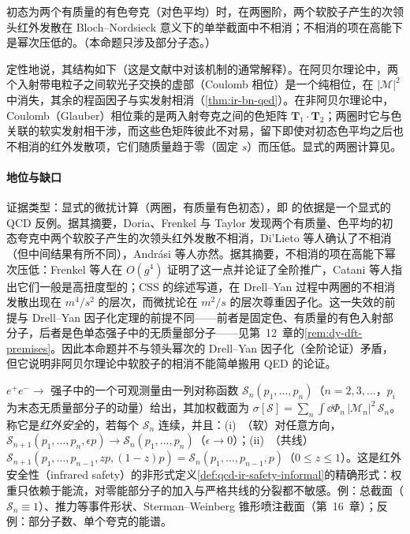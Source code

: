\begin{proposition}\label{prop:ir-bn-failure}
初态为两个有质量的有色夸克（对色平均）时，在两圈阶，两个软胶子产生的次领头红外发散在 Bloch--Nordsieck 意义下的单举截面中不相消；不相消的项在高能下是幂次压低的。（本命题只涉及部分子态。）
\end{proposition}
\begin{proofsketch}
定性地说，其结构如下（这是文献中对该机制的通常解释）。在阿贝尔理论中，两个入射带电粒子之间软光子交换的虚部（Coulomb 相位）是一个纯相位，在 $|\mathcal M|^2$ 中消失，其余的程函因子与实发射相消（\cref{thm:ir-bn-qed}）。在非阿贝尔理论中，Coulomb（Glauber）相位乘的是两入射夸克之间的色矩阵 $\mathbf T_1\cdot\mathbf T_2$；两圈时它与色关联的软实发射相干涉，而这些色矩阵彼此不对易，留下即使对初态色平均之后也不相消的红外发散项，它们随质量趋于零（固定 $s$）而压低。显式的两圈计算见\cite{DoriaFrenkelTaylor1980,DiLietoEtAl1981,Andrasi:1980qw}。
\end{proofsketch}

\paragraph{地位与缺口}
证据类型：显式的微扰计算（两圈，有质量有色初态），即 \tagV 的依据是一个显式的 QCD 反例。据其摘要，Doria、Frenkel 与 Taylor 发现两个有质量、色平均的初态夸克中两个软胶子产生的次领头红外发散不相消\cite{DoriaFrenkelTaylor1980}，Di'Lieto 等人确认了不相消（但中间结果有所不同）\cite{DiLietoEtAl1981}，Andrási 等人亦然\cite{Andrasi:1980qw}。据其摘要，不相消的项在高能下幂次压低：Frenkel 等人在 $O(g^4)$ 证明了这一点并论证了全阶推广\cite{Frenkel:1983di}，Catani 等人指出它们一般是高扭度型的\cite{Catani:1985xt}；CSS 的综述写道，在 Drell--Yan 过程中两圈的不相消发散出现在 $m^4/s^2$ 的层次，而微扰论在 $m^2/s$ 的层次尊重因子化\cite[第~10.2~节]{CollinsSoperSterman1989}。这一失效的前提与 Drell--Yan 因子化定理的前提不同——前者是固定色、有质量的有色入射部分子，后者是色单态强子中的无质量部分子——见第~12~章的\cref{rem:dy-dft-premises}。因此本命题并不与领头幂次的 Drell--Yan 因子化（全阶论证）矛盾，但它说明非阿贝尔理论中软胶子的相消不能简单搬用 QED 的论证。

\begin{definition}[红外安全可观测量]\label{def:ir-safe}
$e^+e^-\to$ 强子中的一个可观测量由一列对称函数 $\mathcal S_n(p_1,\dots,p_n)$（$n=2,3,\dots$，$p_i$ 为末态无质量部分子的动量）给出，其加权截面为 $\sigma[\mathcal S]=\sum_n\int\dd\Phi_n\,|\mathcal M_n|^2\,\mathcal S_n$。称它是\emph{红外安全}的，若每个 $\mathcal S_n$ 连续，并且：(i)~（软）对任意方向，$\mathcal S_{n+1}(p_1,\dots,p_n,\epsilon p)\to\mathcal S_n(p_1,\dots,p_n)$（$\epsilon\to0$）；(ii)~（共线）$\mathcal S_{n+1}(p_1,\dots,p_{n-1},zp,(1-z)p)=\mathcal S_n(p_1,\dots,p_{n-1},p)$（$0\le z\le1$）。这是红外安全性（infrared safety）的非形式定义\cref{def:qcd-ir-safety-informal}的精确形式：权重只依赖于能流，对零能部分子的加入与严格共线的分裂都不敏感。例：总截面（$\mathcal S_n\equiv1$）、推力等事件形状、Sterman--Weinberg 锥形喷注截面（第~16~章）；反例：部分子数、单个夸克的能谱。
\end{definition}

